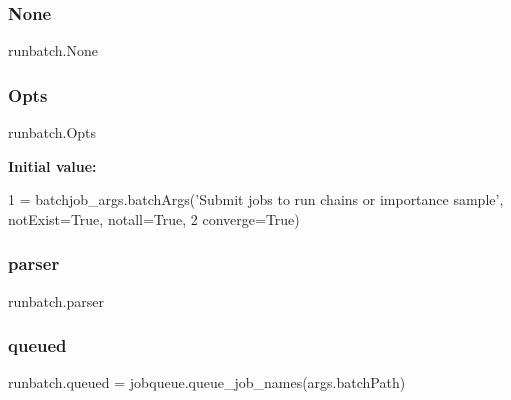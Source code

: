 \mbox{\label{namespacerunbatch_a33ee289953dea56096e7160b0739a25a}} 
\subsubsection{\texorpdfstring{None}{None}}
{\footnotesize\ttfamily runbatch.\+None}

\mbox{\label{namespacerunbatch_a4f18cd32c846ab0a5e16c8faa1870f4d}} 
\subsubsection{\texorpdfstring{Opts}{Opts}}
{\footnotesize\ttfamily runbatch.\+Opts}

{\bfseries Initial value\+:}
\begin{DoxyCode}
1 =  batchjob\_args.batchArgs(\textcolor{stringliteral}{'Submit jobs to run chains or importance sample'}, notExist=\textcolor{keyword}{True}, notall=\textcolor{keyword}{True},
2                               converge=\textcolor{keyword}{True})
\end{DoxyCode}
\mbox{\label{namespacerunbatch_a6677b19d3ca28718e0a595999b9f8508}} 
\subsubsection{\texorpdfstring{parser}{parser}}
{\footnotesize\ttfamily runbatch.\+parser}

\mbox{\label{namespacerunbatch_af487521b97970b4098f133fb087fb1d8}} 
\subsubsection{\texorpdfstring{queued}{queued}}
{\footnotesize\ttfamily runbatch.\+queued = jobqueue.\+queue\+\_\+job\+\_\+names(args.\+batch\+Path)}

\mbox{\label{namespacerunbatch_a45e83936512fc96e82e8fcfd0a1c2934}} 
